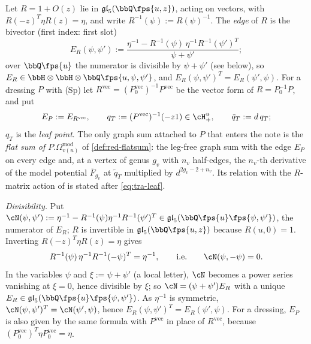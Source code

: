 \begin{defn}
\label{def:tra-edge}
Let $R = 1+O(z)$ lie in $\mathfrak{gl}_5(\bbQ\fps{u,z})$, acting on vectors, with $R(-z)^T\eta R(z) = \eta$, and write $R^{-1}(\psi) := R(\psi)^{-1}$. The \emph{edge} of $R$ is the bivector (first index: first slot)
\[
E_R(\psi,\psi') := \frac{\eta^{-1}-R^{-1}(\psi)\,\eta^{-1}R^{-1}(\psi')^T}{\psi+\psi'} ;
\]
over $\bbQ\fps{u}$ the numerator is divisible by $\psi+\psi'$ (see below), so $E_R\in\bbH\otimes\bbH\otimes\bbQ\fps{u,\psi,\psi'}$, and $E_R(\psi,\psi')^T = E_R(\psi',\psi)$. For a dressing $P$ with (Sp) let $R^{\mathrm{vec}} = (P_0^{\mathrm{vec}})^{-1}P^{\mathrm{vec}}$ be the vector form of $R = P_0^{-1}P$, and put
\[
E_P := E_{R^{\mathrm{vec}}},\qquad q_T := (P^{\mathrm{vec}})^{-1}(-z1)\in\cH^u_+,\qquad \tilde q_T := d\,q_T ;
\]
$q_T$ is the \emph{leaf point}. The only graph sum attached to $P$ that enters the note is the \emph{flat sum of $P.\Omega^{\mathrm{mod}}_{v(u)}$} of \cref{def:red-flatsum}: the leg-free graph sum with the edge $E_P$ on every edge and, at a vertex of genus $g_v$ with $n_v$ half-edges, the $n_v$-th derivative of the model potential $\overline F_{g_v}$ at $\tilde q_T$ multiplied by $d^{2g_v-2+n_v}$. Its relation with the $R$-matrix action of \cite[Def.~2.2]{PPZ15} is stated after \eqref{eq:tra-leaf}.
\end{defn}

\emph{Divisibility.} Put $\cN(\psi,\psi') := \eta^{-1}-R^{-1}(\psi)\eta^{-1}R^{-1}(\psi')^T\in\mathfrak{gl}_5(\bbQ\fps{u}\fps{\psi,\psi'})$, the numerator of $E_R$; $R$ is invertible in $\mathfrak{gl}_5(\bbQ\fps{u,z})$ because $R(u,0) = 1$. Inverting $R(-z)^T\eta R(z) = \eta$ gives
\[
R^{-1}(\psi)\,\eta^{-1}R^{-1}(-\psi)^T = \eta^{-1},\qquad\text{i.e.}\qquad \cN(\psi,-\psi) = 0 .
\] In the variables $\psi$ and $\xi := \psi+\psi'$ (a local letter), $\cN$ becomes a power series vanishing at $\xi = 0$, hence divisible by $\xi$; so $\cN = (\psi+\psi')E_R$ with a unique $E_R\in\mathfrak{gl}_5(\bbQ\fps{u}\fps{\psi,\psi'})$. As $\eta^{-1}$ is symmetric, $\cN(\psi,\psi')^T = \cN(\psi',\psi)$, hence $E_R(\psi,\psi')^T = E_R(\psi',\psi)$. For a dressing, $E_P$ is also given by the same formula with $P^{\mathrm{vec}}$ in place of $R^{\mathrm{vec}}$, because $(P_0^{\mathrm{vec}})^T\eta P_0^{\mathrm{vec}} = \eta$.

